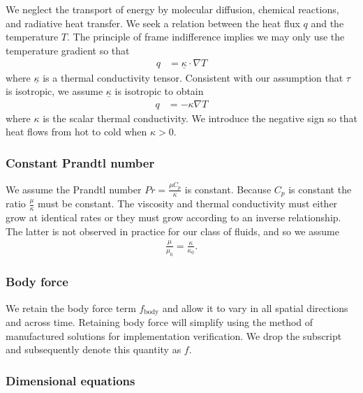 \documentclass[letterpaper,11pt,nointlimits]{amsart}
\begin{document}
We neglect the transport of energy by molecular diffusion, chemical
reactions, and radiative heat transfer.  We seek a relation between
the heat flux $q$ and the temperature $T$.  The principle of 
frame indifference implies we may only use the temperature gradient
so that
\begin{align}
  \label{eq:fouriertensorlaw}
  q &= \underline{\kappa} \cdot \nabla{} T
\end{align}
where $\underline{\kappa}$ is a thermal conductivity tensor.  
Consistent with our assumption that $\tau$ is isotropic, we assume
$\underline{\kappa}$ is isotropic to obtain 
\begin{align}
  \label{eq:fourierlaw}
  q &= - \kappa \nabla{} T
\end{align}
where $\kappa$ is the scalar thermal conductivity.  We introduce the
negative sign so that heat flows from hot to cold when $\kappa>0$.

\subsubsection{Constant Prandtl number}

We assume the Prandtl number $Pr = \frac{\mu{}C_{p}}{\kappa}$ is constant.
Because $C_{p}$ is constant the ratio $\frac{\mu}{\kappa}$ must be
constant.  The viscosity and thermal conductivity must either grow at
identical rates or they must grow according to an inverse relationship.
The latter is not observed in practice for our class of fluids, and
so we assume
\begin{align}
  \frac{\mu}{\mu_{0}} = \frac{\kappa}{\kappa_{0}}
  .
  \label{eq:mukappa}
\end{align}

\subsubsection{Body force}

We retain the body force term $f_{\text{body}}$ and allow it to vary
in all spatial directions and across time.  Retaining body force will
simplify using the method of manufactured solutions for implementation
verification.  We drop the subscript and subsequently denote this quantity
as $f$.

\subsubsection{Dimensional equations}
\end{document}

